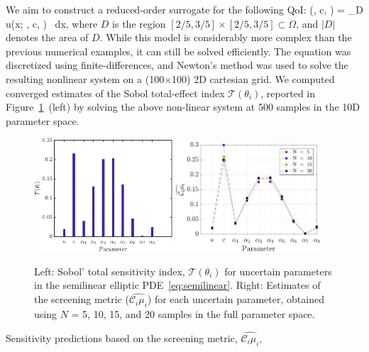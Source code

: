 We aim to construct a reduced-order surrogate for the following QoI:
\be
{}(\kappa, c, \theta) =  \int_D u(x; \kappa, c, \theta) \, dx, 
\label{eq:qoi}
\ee
%
where $D$ is the region $[2/5, 3/5] \times [2/5, 3/5] \subset \Omega$, 
and $|D|$ denotes the area of $D$. 
While this model is considerably more complex than the previous numerical
examples, it can still be solved efficiently.
The equation was discretized using finite-differences, and Newton's method
was used to solve the resulting nonlinear system on a (100$\times$100) 2D
cartesian grid.
We computed converged estimates of the Sobol
total-effect index $\mathcal{T}(\theta_i)$, reported 
in Figure~\ref{fig:sense_elliptic}~(left) by solving the above non-linear
system at 500 samples in the 10D parameter space. 
%
\begin{figure}[htbp]
 \begin{center}
  \includegraphics[width=0.46\textwidth]{./Figures/sense_elliptic}
  \includegraphics[width=0.48\textwidth]{./Figures/ub_conv_elliptic}
\caption{
Left: Sobol' total sensitivity index, $\mathcal{T}(\theta_i)$ for uncertain parameters in the 
semilinear elliptic PDE~\eqref{eq:semilinear}. Right: 
Estimates of the screening metric ($\widehat{\mathcal{C}_i\mu_i}$) for each uncertain parameter,
obtained using $N$ = 5, 10, 15, and 20 samples in the full parameter space.}
\label{fig:sense_elliptic}
\end{center}
\end{figure}
%
Sensitivity predictions based on the screening metric, $\widehat{\mathcal{C}_i\mu_i}$,
